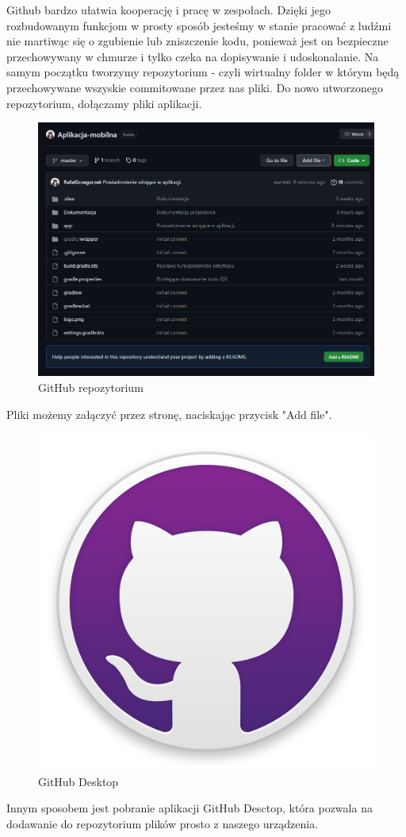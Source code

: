 Github bardzo ułatwia kooperację i pracę w zespołach. Dzięki jego rozbudowanym funkcjom w prosty sposób jesteśmy w stanie pracować z ludźmi nie martiwąc się o zgubienie lub zniszczenie kodu, ponieważ jest on bezpieczne przechowywany w chmurze i tylko czeka na dopisywanie i udoskonalanie.
Na samym początku tworzymy repozytorium - czyli wirtualny folder w którym będą przechowywane wszyskie commitowane przez nas pliki. Do nowo utworzonego repozytorium, dołączamy pliki aplikacji.
\begin{figure}[!hbt]
	\begin{center}
		\includegraphics[width=\linewidth]{rys/git1.png}
		\caption{GitHub repozytorium}
		\label{rys:Github-repo}
	\end{center}
\end{figure}

	\newpage
Pliki możemy załączyć przez stronę, naciskając przycisk "Add file".

\begin{figure}[!hbt]
	\begin{center}
		\includegraphics[width=6 cm]{rys/Github-desktop.png}
		\caption{GitHub Desktop}
		\label{rys:Github-desktop}
	\end{center}
\end{figure}

Innym sposobem jest pobranie aplikacji GitHub Desctop, która pozwala na dodawanie do repozytorium plików prosto z naszego urządzenia.
